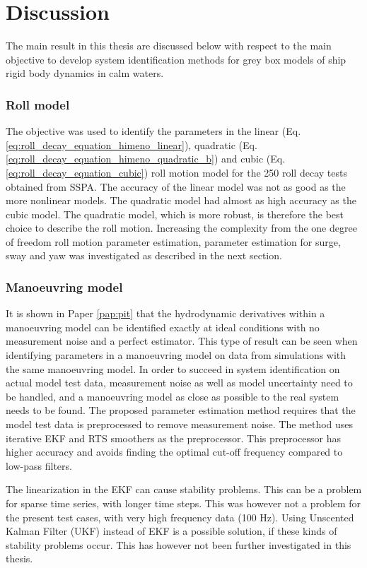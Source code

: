 \section{Discussion}
The main result in this thesis are discussed below with respect to the main objective to develop system identification methods for grey box models of ship rigid body dynamics in calm waters.

\subsubsection*{Roll model}
The objective was used to identify the parameters in the linear (Eq.\ref{eq:roll_decay_equation_himeno_linear}), quadratic (Eq.\ref{eq:roll_decay_equation_himeno_quadratic_b}) and cubic (Eq.\ref{eq:roll_decay_equation_cubic}) roll motion model for the 250 roll decay tests obtained from SSPA. 
The accuracy of the linear model was not as good as the more nonlinear models. The quadratic model had almost as high accuracy as the cubic model. The quadratic model, which is more robust, is therefore the best choice to describe the roll motion. Increasing the complexity from the one degree of freedom roll motion parameter estimation, parameter estimation for surge, sway and yaw was investigated as described in the next section.

\subsubsection*{Manoeuvring model}
It is shown in Paper \ref{pap:pit} that the hydrodynamic derivatives within a manoeuvring model can be identified exactly at ideal conditions with no measurement noise and a perfect estimator. 
This type of result can be seen when identifying parameters in a manoeuvring model on data from simulations with the same manoeuvring model.
In order to succeed in system identification on actual model test data, measurement noise as well as model uncertainty need to be handled, and a manoeuvring model as close as possible to the real system needs to be found. The proposed parameter estimation method requires that the model test data is preprocessed to remove measurement noise. The method uses iterative EKF and RTS smoothers as the preprocessor. This preprocessor has higher accuracy and avoids finding the optimal cut-off frequency compared to low-pass filters. 

The linearization in the EKF can cause stability problems. This can be a problem for sparse time series, with longer time steps. This was however not a problem for the present test cases, with very high frequency data (100 Hz). 
Using Unscented Kalman Filter (UKF) instead of EKF is a possible solution, if these kinds of stability problems occur. This has however not been further investigated in this thesis.

